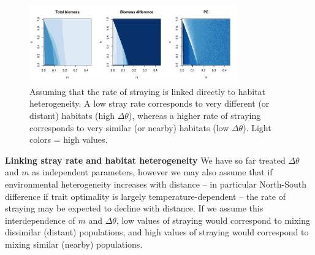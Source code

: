 \documentclass[twocolumn,preprintnumbers,amsmath,amssymb,superscriptaddress]{revtex4}
\begin{document}





  \begin{figure}
    \centering
    \includegraphics[width=0.8\textwidth]{figs/fig_MDPE_hm_mtheta.pdf}
    \caption{
    Assuming that the rate of straying is linked directly to habitat heterogeneity. A low stray rate corresponds to very different (or distant) habitats (high $\Delta\theta$), whereas a higher rate of straying corresponds to very similar (or nearby) habitats (low $\Delta\theta$). Light colors = high values.
    } \label{fig:mtheta}
  \end{figure}




{\bf Linking stray rate and habitat heterogeneity} We have so far treated $\Delta\theta$ and $m$ as independent parameters, however we may also assume that if environmental heterogeneity increases with distance -- in particular North-South difference if trait optimality is largely temperature-dependent -- the rate of straying may be expected to decline with distance.
If we assume this interdependence of $m$ and $\Delta\theta$, low values of straying would correspond to mixing dissimilar (distant) populations, and high values of straying would correspond to mixing similar (nearby) populations.
\end{document}
